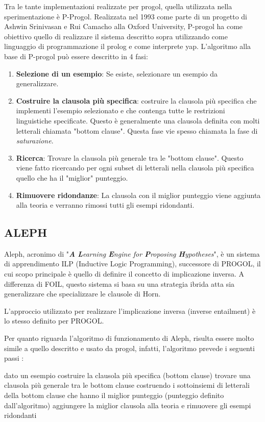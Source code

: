 Tra le tante implementazioni realizzate per progol, quella utilizzata nella sperimentazione è P-Progol. Realizzata nel 1993 come parte di un progetto di Ashwin Srinivasan e Rui Camacho alla Oxford University, P-progol ha come obiettivo quello di realizzare il sistema descritto sopra utilizzando come linguaggio di programmazione il prolog e come interprete yap.
L'algoritmo alla base di P-progol può essere descritto in 4 fasi:
\begin{enumerate}
	\item \textbf{Selezione di un esempio}: Se esiste, selezionare un esempio da generalizzare.
	\item \textbf{Costruire la clausola più specifica}: costruire la clausola più specifica che implementi l'esempio selezionato e che contenga tutte le restrizioni linguistiche specificate. Questo è generalmente una clausola definita con molti letterali chiamata "bottom clause". Questa fase vie spesso chiamata la fase di \emph{saturazione}.
	\item \textbf{Ricerca}: Trovare la clausola più generale tra le "bottom clause". Questo viene fatto ricercando per ogni subset di letterali nella clausola più specifica quello che ha il "miglior" punteggio.
	\item \textbf{Rimuovere ridondanze}: La clausola con il miglior punteggio viene aggiunta alla teoria e verranno rimossi tutti gli esempi ridondanti.
\end{enumerate}

\subsection{ALEPH}
\label{sistemi:aleph}
Aleph, acronimo di "\emph{\textbf{A} \textbf{L}earning \textbf{E}ngine for \textbf{P}roposing \textbf{H}ypotheses}", è un sistema di apprendimento ILP (Inductive Logic Programming), successore di PROGOL, il cui scopo principale è quello di definire il concetto di implicazione inversa.
A differenza di FOIL, questo sistema si basa su una strategia ibrida atta sia generalizzare che specializzare le clausole di Horn. 

L'approccio utilizzato per realizzare l'implicazione inversa (inverse entailment) è lo stesso definito per PROGOL.

Per quanto riguarda l'algoritmo di funzionamento di Aleph, risulta essere molto simile a quello descritto e usato da progol, infatti, l'algoritmo prevede i seguenti passi :

\begin{algorithm}
	\begin{algorithmic}[1]
		\STATE dato un esempio costruire la clausola più specifica (bottom clause)
		\STATE trovare una clausola più generale tra le bottom clause costruendo i sottoinsiemi di letterali della bottom clause che hanno il miglior punteggio (punteggio definito dall'algoritmo)
		\STATE aggiungere la miglior clausola alla teoria e rimuovere gli esempi ridondanti 
		\ENDFOR
	\end{algorithmic}
\end{algorithm}

